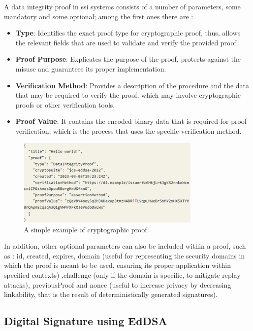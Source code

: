 A data integrity proof in \gls{ssi} systems consists of a number of parameters, some mandatory and some optional; among the first ones there are \cite{VCDataIntegrity}: 

\begin{itemize}
  \item \textbf{Type}: Identifies the exact proof type for cryptographic proof, thus, allows the relevant fields that are used to validate and verify the provided proof.
  \item \textbf{Proof Purpose}: Explicates the purpose of the proof, protects against the misuse and guarantees its proper implementation.
  \item \textbf{Verification Method}: Provides a description of the procedure and the data that may be required to verify the proof, which may involve cryptographic proofs 
  or other verification tools.
  \item \textbf{Proof Value}: It contains the encoded binary data that is required for proof verification, which is the process that uses the specific verification method.
\end{itemize}

\begin{figure}[h]  
  \centering
  \includegraphics[width=0.8\textwidth]{Images/c5_3.png} 
  \caption{A simple example of cryptographic proof.}
\end{figure}

In addition, other optional parameters can also be included within a proof, such as \cite{VCDataIntegrity}: id, created, expires, domain (useful for representing the security domains in which the 
proof is meant to be used, ensuring its proper application within specified contexts) ,challenge (only if the domain is specific, to mitigate replay attacks), previousProof 
and nonce (useful to increase privacy by decreasing linkability, that is the result of deterministically generated signatures).

\subsection{Digital Signature using EdDSA}

